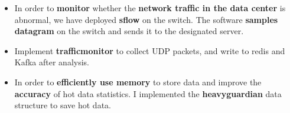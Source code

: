 \documentclass[12pt,a4paper,ragged2e]{altacv}
\begin{document}

\begin{fullwidth}
\makecvheader
\end{fullwidth}




\divider


\setlength{\baselineskip}{16pt}
\begin{itemize}
\justifying
\item In order to \textbf{monitor} whether the \textbf{network traffic in the data center} is abnormal, we have deployed \textbf{sflow} on the switch.
The software \textbf{samples datagram} on the switch and sends it to the designated server.
\item Implement \textbf{trafficmonitor} to collect UDP packets, and write to redis and Kafka after analysis.
\item In order to \textbf{efficiently use memory} to store data and improve the \textbf{accuracy} of hot data statistics.
I implemented the \textbf{heavyguardian} data structure to save hot data.
\end{itemize}
\end{document}
